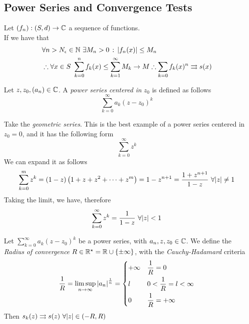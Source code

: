 \documentclass[../complete.tex]{subfiles}
\begin{document}
\subsection{Power Series and Convergence Tests}
\begin{thm}
	Let $(f_n):(S,d)\to\mathbb{C}$ a sequence of functions.\\
	If we have that
	\begin{equation*}
		\begin{aligned}
			&\forall n>N_\epsilon\in\N\ \exists M_n>0\st\abs{f_n(x)}\le M_n\\
			&\therefore\forall x\in S\ \sum_{k=0}^nf_k(x)\le\sum_{k=1}^{\infty}M_k\to M\therefore\sum_{k=0}f_k(x)^n\tto s(x)
		\end{aligned}
	\end{equation*}
\end{thm}
\begin{dfn}
	Let $z,z_0,(a_n)\in\mathbb{C}$. A \textit{power series centered in} $z_0$ is defined as follows
	\begin{equation}
		\sum_{k=0}^\infty a_k(z-z_0)^k
		\label{eq:powerseries}
	\end{equation}
\end{dfn}
\begin{eg}
	Take the \textit{geometric series}. This is the best example of a power series centered in $z_0=0$, and it has the following form
	\begin{equation}
		\sum_{k=0}^\infty z^k
		\label{eq:geometricpw}
	\end{equation}
	We can expand it as follows
	\begin{equation}
		\sum_{k=0}^{m}z^k=(1-z)\left( 1+z+z^2+\cdots+z^m \right)=1-z^{n+1}=\frac{1+z^{n+1}}{1-z}\ \forall\abs{z}\ne1
		\label{eq:geometricseries}
	\end{equation}
	Taking the limit, we have, therefore
	\begin{equation}
		\sum_{k=0}^{\infty}z^k=\frac{1}{1-z}\ \forall\abs{z}<1
		\label{eq:geometricseriessum}
	\end{equation}
\end{eg}
\begin{thm}
	Let $\sum_{k=0}^{\infty}a_k(z-z_0)^k$ be a power series, with $a_n,z,z_0\in\mathbb{C}$. We define the \textit{Radius of convergence} $R\in\mathbb{R}^{\star}=\mathbb{R}\cup\{\pm\infty\}$, with the \textit{Cauchy-Hadamard} criteria
	\begin{equation}
		\frac{1}{R}=\limsup_{n\to\infty}\abs{a_n}^{\frac{1}{n}}=\begin{dcases}+\infty&\frac{1}{R}=0\\l&0<\frac{1}{R}=l<\infty\\0&\frac{1}{R}=+\infty\end{dcases}
		\label{eq:cauchyhadamard}
	\end{equation}
	Then $s_k(z)\tto s(z)\ \forall\abs{z}\in(-R,R)$
\end{thm}
\end{document}
